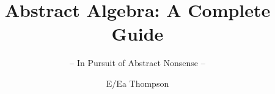 \documentclass[graybox,envcountchap,sectrefs]{style/svmono}
\begin{document}
\author{E/Ea Thompson}
\title{Abstract Algebra: A Complete Guide}
\subtitle{-- In Pursuit of Abstract Nonsense --}
\maketitle

\frontmatter%

%
%

%

\tableofcontents

%


\mainmatter%




































\backmatter%
%
%
%
\printindex

\end{document}
